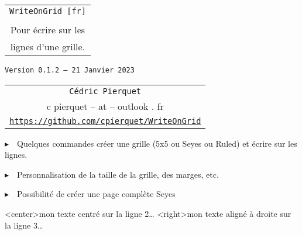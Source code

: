 \documentclass[a4paper]{article}
\def\TPversion{0.1.2}
\def\TPdate{21 Janvier 2023}
\begin{document}
\pagestyle{fancy}

\thispagestyle{empty}

\vspace{2cm}

\begin{center}
	\begin{minipage}{0.75\linewidth}
	\begin{tcolorbox}[colframe=yellow,colback=yellow!15]
		\begin{center}
			\begin{tabular}{c}
				{\Huge \texttt{WriteOnGrid [fr]}}\\
				\\
				{\LARGE Pour écrire sur les} \\
				{\LARGE lignes d'une grille.}
			\end{tabular}
			
			\medskip
			
			{\small \texttt{Version \TPversion{} -- \TPdate}}
		\end{center}
	\end{tcolorbox}
\end{minipage}
\end{center}

\vspace{0.5cm}

\begin{center}
	\begin{tabular}{c}
	\texttt{Cédric Pierquet}\\
	{\ttfamily c pierquet -- at -- outlook . fr}\\
	\texttt{\url{https://github.com/cpierquet/WriteOnGrid}}
\end{tabular}
\end{center}

\vspace{0.5cm}

{$\blacktriangleright$~~Quelques commandes créer une grille (5x5 ou Seyes ou Ruled) et écrire \og sur \fg{} les lignes.}

\smallskip

{$\blacktriangleright$~~Personnalisation de la taille de la grille, des marges, etc.}

\smallskip

{$\blacktriangleright$~~Possibilité de créer une page complète Seyes}

\vspace{1cm}

\begin{center}
	\begin{EnvQuadrillage}[NbCarreaux=22x8]
	\EcrireLigne<center>{mon texte centré sur la ligne 2\ldots}
	\EcrireLigne<right>{mon texte aligné à droite sur la ligne 3\ldots}
	\PasseLigne
\end{EnvQuadrillage}
\end{center}
\end{document}
